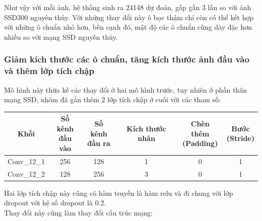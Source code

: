 \documentclass[a4paper,12pt]{article}
\begin{document}
	Như vậy với mỗi ảnh, hệ thống sinh ra 24148 dự đoán, gấp gần 3 lần so với ảnh SSD300 nguyên thủy\cite{liu2016ssd}. Với những thay đổi này ô bọc thậm chí còn có thể kết hợp với những ô chuẩn nhỏ hơn, bên cạnh đó, mật độ các ô chuẩn cũng dày đặc hơn nhiều so với mạng SSD nguyên thủy\cite{liu2016ssd}.
	
	\subsubsection*{Giảm kích thước các ô chuẩn, tăng kích thước ảnh đầu vào và thêm lớp tích chập}
	
	Mô hình này thừa kế các thay đổi ở hai mô hình trước, tuy nhiên ở phần thân mạng SSD\cite{liu2016ssd}, nhóm đã gắn thêm 2 lớp tích chập ở cuối với các tham số: \\
	
	\begin{center}
		\begin{tabular}{||c | c | c | c | c | c ||} 
			\hline
			Khối & \makecell{ Số kênh \\ đầu vào } & \makecell{ Số kênh \\ đầu ra} & Kích thước nhân &  \makecell{ Chèn thêm \\ (Padding) } &  \makecell{ Bước \\ (Stride) } \\ [0.5ex] 
			\hline\hline
			Conv\_12\_1 & 256 & 128 & 1 & 0 & 1 \\ 
			\hline
			Conv\_12\_2 & 128 & 256 & 3 & 0 & 1 \\ 
			\hline
		\end{tabular}
	\end{center}
	Hai lớp tích chập này cũng có hàm truyền là hàm relu và đi chung với lớp dropout\cite{srivastava2014dropout} với hệ số dropout là 0.2. \\
	
	Thay đổi này cũng làm thay đổi cấu trúc mạng:
	
\end{document}
